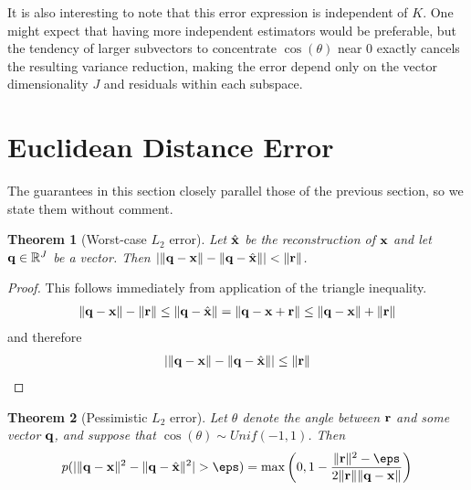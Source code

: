 \documentclass[]{article}
\newtheorem{theorem}{Theorem}[section]
\begin{document}
It is also interesting to note that this error expression is independent of $K$. One might expect that having more independent estimators would be preferable, but the tendency of larger subvectors to concentrate $\cos(\theta)$ near $0$ exactly cancels the resulting variance reduction, making the error depend only on the vector dimensionality $J$ and residuals within each subspace. %

\section{Euclidean Distance Error}

The guarantees in this section closely parallel those of the previous section, so we state them without comment.


\begin{theorem}[Worst-case $L_2$ error] \label{thm:worst_l2}
Let $\hat{\mathbf{x}}$ be the reconstruction of $\mathbf{x}$ and let $\mathbf{q} \in \mathbb{R}^J$ be a vector. Then $\lvert\lVert\mathbf{q} - \mathbf{x}\rVert - \lVert\mathbf{q} - \hat{\mathbf{x}}\rVert \rvert < \lVert\mathbf{r}\rVert$.
\end{theorem}

\begin{proof}
This follows immediately from application of the triangle inequality. %
\begin{align}
   \lVert\mathbf{q} - \mathbf{x}\rVert - \lVert\mathbf{r}\rVert \le \lVert\mathbf{q} - \hat{\mathbf{x}}\rVert = \lVert\mathbf{q} - \mathbf{x} + \mathbf{r}\rVert \le \lVert\mathbf{q} - \mathbf{x}\rVert + \lVert\mathbf{r}\rVert
\end{align}
and therefore
\begin{align}
    \lvert\lVert\mathbf{q} - \mathbf{x}\rVert - \lVert\mathbf{q} - \hat{\mathbf{x}}\rVert \rvert \le \lVert\mathbf{r}\rVert
\end{align}
\end{proof}


\begin{theorem}[Pessimistic $L_2$ error]
Let $\theta$ denote the angle between $\mathbf{r}$ and some vector $\mathbf{q}$, and suppose that $\cos(\theta) \sim Unif(-1, 1)$. Then
\begin{align} \label{eq:l2_unif}
    p(\abs{ \norm{\q - \x}^2 - \norm{\q - \xhat}^2 } > \eps) = \max \left( 0, 1 - \frac{\norm{\r}^2 - \eps }{ 2\norm{\r}\norm{\q - \x} } \right)
\end{align}
\end{theorem}
\end{document}
